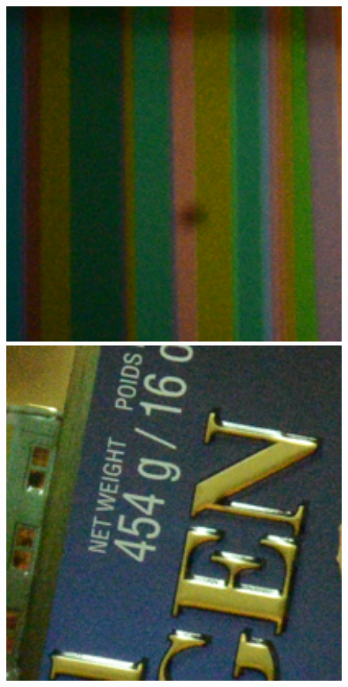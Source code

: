 \documentclass[10pt,twocolumn,letterpaper,sort&compress]{article}
\begin{document}
\begin{figure}
{\begin{minipage}{0.085\textwidth}
\end{minipage}
\begin{minipage}{0.085\textwidth}
\includegraphics[width=1\textwidth]{CC15images/resize_d800_iso3200_3_real.png}
\end{minipage}
\begin{minipage}{0.085\textwidth}
\includegraphics[width=1\textwidth]{CC15images/resize_d800_iso6400_1_real.png}

\end{minipage}}
\end{figure}
\end{document}
